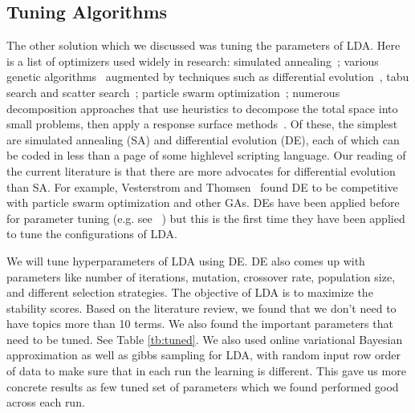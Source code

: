 \documentclass[conference]{IEEEtran}
\theoremstyle{break}
\begin{document}
\subsection{Tuning Algorithms}
\label{sect: tuning}
The other solution which we discussed was tuning the parameters of LDA. Here is a list of optimizers used widely in research: simulated annealing~\cite{feather2002converging, menzies2007business}; various genetic algorithms~\cite{goldberg1979complexity} augmented by techniques such as differential evolution~\cite{storn1997differential}, tabu search and scatter search~\cite{glover1986general, beausoleil2006moss, molina2007sspmo, nebro2008abyss}; particle swarm optimization~\cite{pan2008particle}; numerous decomposition approaches that use heuristics to decompose the total space into small problems, then apply a response surface methods~\cite{krall2015gale, zuluaga2013active}. Of these, the simplest are simulated annealing (SA) and differential evolution (DE), each of which can be coded in less than a page of some highlevel scripting language. Our reading of the current literature is that there are more advocates for differential evolution than SA. For example, Vesterstrom and Thomsen~\cite{vesterstrom2004comparative} found DE to be competitive with particle swarm optimization and other GAs. DEs have been applied before for parameter tuning (e.g. see~\cite{omran2005differential, chiha2012tuning, fu2016tuning} ) but this is the first time they have been applied to tune the configurations of LDA.

We will tune hyperparameters of LDA using DE. DE also comes up with parameters like number of iterations, mutation, crossover rate, population size, and different selection strategies. The objective of LDA is to maximize the stability scores. Based on the literature review, we found that we don't need to have topics more than 10 terms. We also found the important parameters that need to be tuned. See Table \ref{tb:tuned}. We also used online variational Bayesian approximation as well as gibbs sampling for LDA, with random input row order of data to make sure that in each run the learning is different. This gave us more concrete results as few tuned set of parameters which we found performed good across each run.
\end{document}
